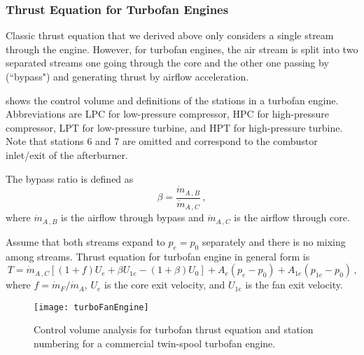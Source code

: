 \subsubsection{Thrust Equation for Turbofan Engines}
Classic thrust equation that we derived above only considers a single stream through the engine. However, for turbofan engines, the air stream is split into two separated streams \textendash one going through the core and the other one passing by (``bypass") and generating thrust by airflow acceleration. 

 shows the control volume and definitions of the stations in a turbofan engine. Abbreviations are LPC for low-pressure compressor, HPC for high-pressure compressor, LPT for low-pressure turbine, and HPT for high-pressure turbine. Note that stations 6 and 7 are omitted and correspond to the combustor inlet/exit of the afterburner.

The bypass ratio is defined as
\begin{equation}
\beta = \frac{\dot{m}_{A\,,B}}{\dot{m}_{A\,,C}} \,,
\end{equation}
where $\dot{m}_{A\,,B}$ is the airflow through bypass and $\dot{m}_{A\,,C}$ is the airflow through core.

Assume that both streams expand to $p_e = p_0$ separately and there is no mixing among streams. Thrust equation for turbofan engine in general form is
\begin{equation}
  T = \dot{m}_{A\,,C} \left[ (1+f) U_e + \beta U_{1e} - (1+\beta) U_0 \right] + A_e (p_e - p_0) + A_{1e} (p_{1e} - p_0)\, \text{,}
\end{equation}
where $f = \dot{m}_F/\dot{m}_A$, $U_e$ is the core exit velocity, and $U_{1e}$ is the fan exit velocity.

\begin{figure}[!htb!]
 \centering
    {\texttt{[image: turboFanEngine]}}
    \caption{\label{FIG_STATION_NUMBERING}Control volume analysis for turbofan thrust equation and station numbering for a commercial twin-spool turbofan engine.}
\end{figure}

